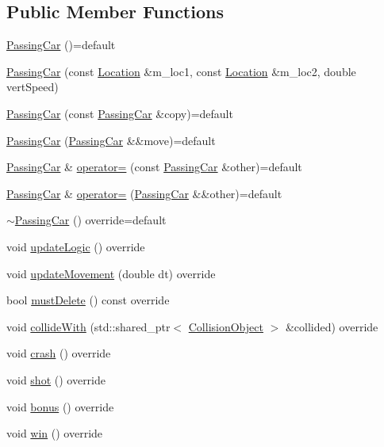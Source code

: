 \subsection*{Public Member Functions}
\begin{DoxyCompactItemize}
\item 
\hyperlink{classroadfighter_1_1PassingCar_af071c33cd301f1558054423d30b0b0fd}{Passing\+Car} ()=default
\item 
\hyperlink{classroadfighter_1_1PassingCar_a0492e46e1930b2eec14622a61d33acc2}{Passing\+Car} (const \hyperlink{classroadfighter_1_1Location}{Location} \&m\+\_\+loc1, const \hyperlink{classroadfighter_1_1Location}{Location} \&m\+\_\+loc2, double vert\+Speed)
\item 
\hyperlink{classroadfighter_1_1PassingCar_abf5e19562be7b8d2ff71557fb2027aae}{Passing\+Car} (const \hyperlink{classroadfighter_1_1PassingCar}{Passing\+Car} \&copy)=default
\item 
\hyperlink{classroadfighter_1_1PassingCar_aabea2fb415c816c0308399cd49732d83}{Passing\+Car} (\hyperlink{classroadfighter_1_1PassingCar}{Passing\+Car} \&\&move)=default
\item 
\hyperlink{classroadfighter_1_1PassingCar}{Passing\+Car} \& \hyperlink{classroadfighter_1_1PassingCar_aa3cbe5aa96205e8b7f4ba99531e47735}{operator=} (const \hyperlink{classroadfighter_1_1PassingCar}{Passing\+Car} \&other)=default
\item 
\hyperlink{classroadfighter_1_1PassingCar}{Passing\+Car} \& \hyperlink{classroadfighter_1_1PassingCar_a5cae5b484691e5975d2b9d59254108ad}{operator=} (\hyperlink{classroadfighter_1_1PassingCar}{Passing\+Car} \&\&other)=default
\item 
\hyperlink{classroadfighter_1_1PassingCar_ab590a845658cdb5aae74c0a922548aa8}{$\sim$\+Passing\+Car} () override=default
\item 
void \hyperlink{classroadfighter_1_1PassingCar_ac3fe3087290121bf44880f94efa3a916}{update\+Logic} () override
\item 
void \hyperlink{classroadfighter_1_1PassingCar_ade5ebca5d7dbdb75bd9eee5817972363}{update\+Movement} (double dt) override
\item 
bool \hyperlink{classroadfighter_1_1PassingCar_a96b365c19d4e6e940d3827319434a022}{must\+Delete} () const override
\item 
void \hyperlink{classroadfighter_1_1PassingCar_a04ee71b75c90f21efef591756855bf37}{collide\+With} (std\+::shared\+\_\+ptr$<$ \hyperlink{classroadfighter_1_1CollisionObject}{Collision\+Object} $>$ \&collided) override
\item 
void \hyperlink{classroadfighter_1_1PassingCar_a5c437fb5164d2735881a469650db048d}{crash} () override
\item 
void \hyperlink{classroadfighter_1_1PassingCar_ac04b801b789bf880011d5cdb1ffdec59}{shot} () override
\item 
void \hyperlink{classroadfighter_1_1PassingCar_a43d55e28efe840d81c1b87216920eb69}{bonus} () override
\item 
void \hyperlink{classroadfighter_1_1PassingCar_a365d8befb1c2fd34337fc25665ccc73f}{win} () override
\end{DoxyCompactItemize}


